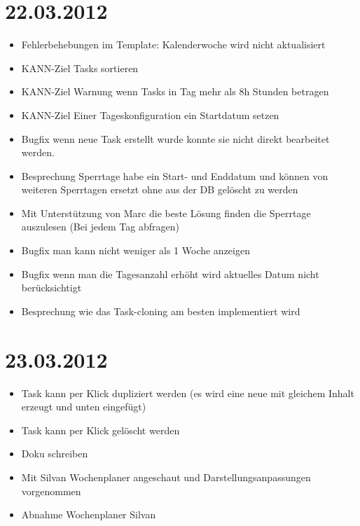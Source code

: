\section{22.03.2012}
    \begin{itemize}
        \item Fehlerbehebungen im Template: Kalenderwoche wird nicht aktualisiert
        \item KANN-Ziel Tasks sortieren
        \item KANN-Ziel Warnung wenn Tasks in Tag mehr als 8h Stunden betragen
        \item KANN-Ziel Einer Tageskonfiguration ein Startdatum setzen
        \item Bugfix wenn neue Task erstellt wurde konnte sie nicht direkt bearbeitet werden.
        \item Besprechung Sperrtage habe ein Start- und Enddatum und können von weiteren Sperrtagen ersetzt ohne aus der DB gelöscht zu werden
        \item Mit Unterstützung von Marc die beste Lösung finden die Sperrtage auszulesen (Bei jedem Tag abfragen)
        \item Bugfix man kann nicht weniger als 1 Woche anzeigen
        \item Bugfix wenn man die Tagesanzahl erhöht wird aktuelles Datum nicht berücksichtigt
        \item Besprechung wie das Task-cloning am besten implementiert wird
    \end{itemize}
\section{23.03.2012}
    \begin{itemize}
        \item Task kann per Klick dupliziert werden (es wird eine neue mit gleichem Inhalt erzeugt und unten eingefügt)
        \item Task kann per Klick gelöscht werden
        \item Doku schreiben
        \item Mit Silvan Wochenplaner angeschaut und Darstellungsanpassungen vorgenommen
        \item Abnahme Wochenplaner Silvan
    \end{itemize}
